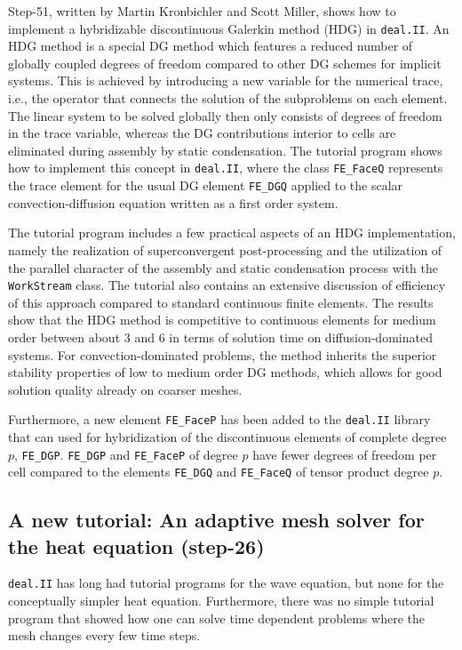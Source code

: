 \documentclass{siamltex}
\newcommand{\specialword}[1]{\texttt{#1}}
\newcommand{\dealii}{{\specialword{deal.II}}}
\begin{document}
Step-51, written by Martin Kronbichler and Scott Miller, shows how to
implement a hybridizable discontinuous Galerkin method (HDG) in \dealii{}. An
HDG method is a special DG method which features a reduced number of
globally coupled degrees of freedom compared to other DG schemes for implicit
systems. This is achieved by
introducing a new variable for the numerical trace, i.e., the operator that
connects the solution of the subproblems on each element. The linear system to
be solved globally then only consists of degrees of freedom in the trace variable,
whereas the DG contributions interior to cells are eliminated during assembly by static
condensation. The tutorial program shows how to implement this concept in \dealii{},
where the class \texttt{FE\_FaceQ} represents the trace element for the usual
DG element \texttt{FE\_DGQ} applied to the scalar convection-diffusion
equation written as a first order system. 

The tutorial program includes a few
practical aspects of an HDG implementation, namely the realization of
superconvergent post-processing and the utilization of the parallel character
of the assembly and static condensation process with the \texttt{WorkStream}
class. The tutorial also contains an extensive discussion of efficiency of
this approach compared to standard continuous finite elements. The results
show that the HDG method is competitive to continuous elements for medium
order between about 3 and 6 in terms of solution time on diffusion-dominated
systems. For convection-dominated problems, the method inherits the superior
stability properties of low to medium order DG methods, which allows for good
solution quality already on coarser meshes.

Furthermore, a new element \texttt{FE\_FaceP} has been added to the \dealii{}
library that can used for hybridization of the discontinuous elements of
complete degree $p$, \texttt{FE\_DGP}. \texttt{FE\_DGP} and \texttt{FE\_FaceP}
of degree $p$ have fewer degrees of freedom per cell compared to the elements
\texttt{FE\_DGQ} and \texttt{FE\_FaceQ} of tensor product degree $p$.


\subsection{A new tutorial: An adaptive mesh solver for the heat
  equation (step-26)}
\label{sec:step26}

\dealii{} has long had tutorial programs for the wave equation, but none for
the conceptually simpler heat equation. Furthermore, there was no simple
tutorial program that showed how one can solve time dependent problems where
the mesh changes every few time steps.
\end{document}
